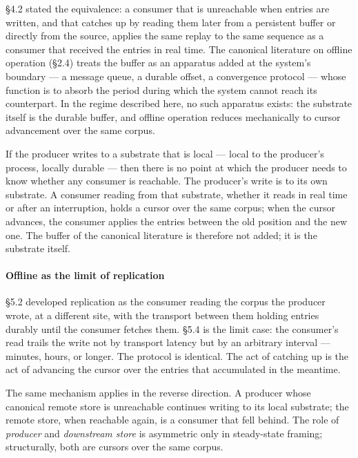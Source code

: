 \documentclass[
]{article}
\begin{document}
§4.2 stated the equivalence: a consumer that is unreachable when entries
are written, and that catches up by reading them later from a persistent
buffer or directly from the source, applies the same replay to the same
sequence as a consumer that received the entries in real time. The
canonical literature on offline operation (§2.4) treats the buffer as an
apparatus added at the system's boundary --- a message queue, a durable
offset, a convergence protocol --- whose function is to absorb the
period during which the system cannot reach its counterpart. In the
regime described here, no such apparatus exists: the substrate itself is
the durable buffer, and offline operation reduces mechanically to cursor
advancement over the same corpus.

If the producer writes to a substrate that is local --- local to the
producer's process, locally durable --- then there is no point at which
the producer needs to know whether any consumer is reachable. The
producer's write is to its own substrate. A consumer reading from that
substrate, whether it reads in real time or after an interruption, holds
a cursor over the same corpus; when the cursor advances, the consumer
applies the entries between the old position and the new one. The buffer
of the canonical literature is therefore not added; it is the substrate
itself.

\paragraph{Offline as the limit of
replication}\label{offline-as-the-limit-of-replication}

§5.2 developed replication as the consumer reading the corpus the
producer wrote, at a different site, with the transport between them
holding entries durably until the consumer fetches them. §5.4 is the
limit case: the consumer's read trails the write not by transport
latency but by an arbitrary interval --- minutes, hours, or longer. The
protocol is identical. The act of catching up is the act of advancing
the cursor over the entries that accumulated in the meantime.

The same mechanism applies in the reverse direction. A producer whose
canonical remote store is unreachable continues writing to its local
substrate; the remote store, when reachable again, is a consumer that
fell behind. The role of \emph{producer} and \emph{downstream store} is
asymmetric only in steady-state framing; structurally, both are cursors
over the same corpus.
\end{document}

